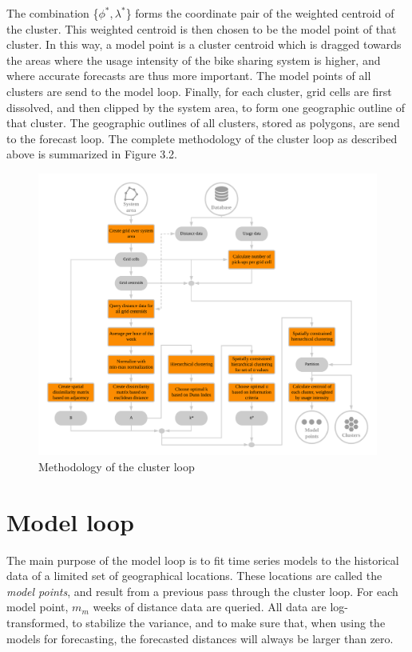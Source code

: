\documentclass[12pt,oneside]{reedthesis}
\begin{document}
The combination \{\(\phi^{*}, \lambda^{*}\)\} forms the coordinate pair
of the weighted centroid of the cluster. This weighted centroid is then
chosen to be the model point of that cluster. In this way, a model point
is a cluster centroid which is dragged towards the areas where the usage
intensity of the bike sharing system is higher, and where accurate
forecasts are thus more important. The model points of all clusters are
send to the model loop. Finally, for each cluster, grid cells are first
dissolved, and then clipped by the system area, to form one geographic
outline of that cluster. The geographic outlines of all clusters, stored
as polygons, are send to the forecast loop. The complete methodology of
the cluster loop as described above is summarized in Figure 3.2.
\begin{figure}[h]
\includegraphics[width=\textwidth]{Figures/Clusterloop} \caption{Methodology of the cluster loop}\label{fig:clusterloop}
\end{figure}
\section{Model loop}\label{model-loop}

The main purpose of the model loop is to fit time series models to the
historical data of a limited set of geographical locations. These
locations are called the \emph{model points}, and result from a previous
pass through the cluster loop. For each model point, \(m_{m}\) weeks of
distance data are queried. All data are log-transformed, to stabilize
the variance, and to make sure that, when using the models for
forecasting, the forecasted distances will always be larger than zero.
\end{document}
